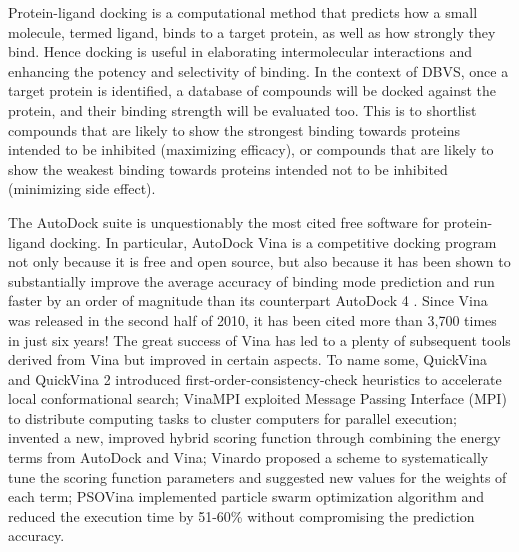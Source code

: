 \documentclass[a4paper,12pt]{article}
\begin{document}
Protein-ligand docking is a computational method that predicts how a small molecule, termed ligand, binds to a target protein, as well as how strongly they bind. Hence docking is useful in elaborating intermolecular interactions and enhancing the potency and selectivity of binding. In the context of DBVS, once a target protein is identified, a database of compounds will be docked against the protein, and their binding strength will be evaluated too. This is to shortlist compounds that are likely to show the strongest binding towards proteins intended to be inhibited (maximizing efficacy), or compounds that are likely to show the weakest binding towards proteins intended not to be inhibited (minimizing side effect).

The AutoDock suite \citep{1730} is unquestionably the most cited free software for protein-ligand docking. In particular, AutoDock Vina \citep{595} is a competitive docking program not only because it is free and open source, but also because it has been shown to substantially improve the average accuracy of binding mode prediction and run faster by an order of magnitude than its counterpart AutoDock 4 \citep{596}. Since Vina was released in the second half of 2010, it has been cited more than 3,700 times in just six years! The great success of Vina has led to a plenty of subsequent tools derived from Vina but improved in certain aspects. To name some, QuickVina \citep{1193} and QuickVina 2 \citep{1664} introduced first-order-consistency-check heuristics to accelerate local conformational search; VinaMPI \citep{1329} exploited Message Passing Interface (MPI) to distribute computing tasks to cluster computers for parallel execution; \citeauthor{1716} \citep{1716} invented a new, improved hybrid scoring function through combining the energy terms from AutoDock and Vina; Vinardo \citep{1741} proposed a scheme to systematically tune the scoring function parameters and suggested new values for the weights of each term; PSOVina \citep{1789} implemented particle swarm optimization algorithm and reduced the execution time by 51-60\% without compromising the prediction accuracy.
\end{document}
